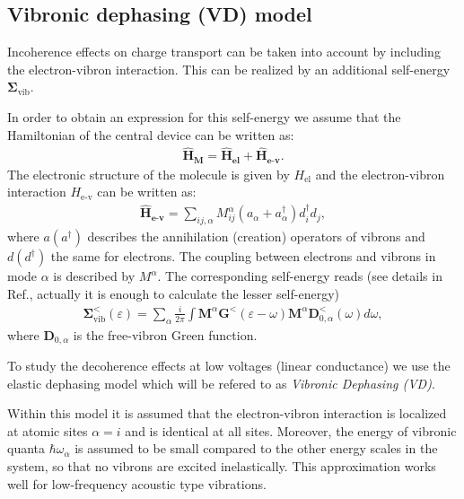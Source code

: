 \documentclass[reprint,superscriptaddress,nofootinbib,amsmath,amssymb,prb,floatfix]{revtex4-1}
\begin{document}
\subsection{Vibronic dephasing (VD) model}
\label{sec_VD}

Incoherence effects on charge transport can be taken into account by including the electron-vibron
interaction. This can be realized by an additional self-energy $\boldsymbol{\Sigma}_\text{vib}$.

In order to obtain an expression for this self-energy we assume that the Hamiltonian of the central
device can be written as:
%
\begin{align}
  \boldsymbol{\hat{H}_\text{M}} = \boldsymbol{\hat{H}_\text{el}} + \boldsymbol{\hat{H}_\text{e-v}}.
\end{align}
The electronic structure of the molecule is given by $H_\text{el}$ and the electron-vibron
interaction $H_\text{e-v}$ can be written as:
%
\begin{align}
  \boldsymbol{\hat{H}_\text{e-v}} = \sum_{ij,\alpha}M_{ij}^\alpha (a_\alpha + a_\alpha^\dagger)d_i^\dagger d_j,
\end{align}
where $a(a^\dagger)$ describes the annihilation (creation) operators of vibrons and $d(d^\dagger)$
the same for electrons. The coupling between electrons and vibrons in mode $\alpha$ is described by
$M^\alpha$.  The corresponding self-energy reads (see details in Ref.\cite{Ryndyk2015}, actually it
is enough to calculate the lesser self-energy)
%
\begin{align}
  \label{sigma_r}
\mathbf{\Sigma}^{<}_\text{vib}(\varepsilon) = %
\sum_\alpha \frac{i}{2\pi} \int \mathbf{M}^\alpha\mathbf{G}^<(\varepsilon - \omega)\mathbf{M}^\alpha \mathbf{D}^<_{0,\alpha}(\omega) d\omega,
\end{align}
%
where $\mathbf{D}_{0,\alpha}$ is the free-vibron Green function.

To study the decoherence effects at low voltages (linear conductance) we use the elastic dephasing
model \cite{penazzi_self_2016,bihary_dephasing_2005,golizadeh-mojarad_nonequilibrium_2007,
  cresti_electronic_2006}
which will be refered to as \textit{Vibronic Dephasing (VD)}.

Within this model it is assumed that the electron-vibron interaction is localized at atomic sites
$\alpha = i$ and is identical at all sites.  Moreover, the energy of vibronic quanta
$\hbar\omega_\alpha$ is assumed to be small compared to the other energy scales in the system, so
that no vibrons are excited inelastically. This approximation works well for low-frequency acoustic
type vibrations.
\end{document}
